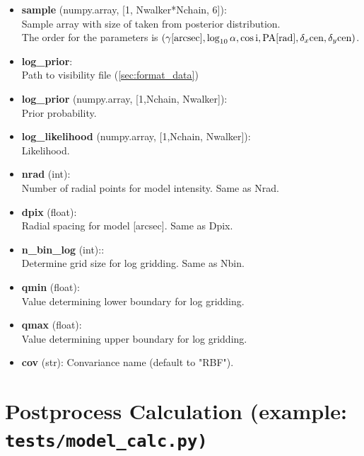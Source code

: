 \documentclass{report}
\begin{document}
\begin{itemize}
    \item \textbf{sample} (numpy.array, [1, Nwalker*Nchain, 6]): \\ Sample array with size of  taken from posterior distribution. \\ 
    The order for the parameters is 
$(\gamma [{\rm arcsec}], \log_{10} \alpha, \cos {\rm i}, {\rm PA [rad]}, \delta_x{\rm cen}, \delta_y{\rm cen})$.    \item \textbf{log\_prior}: \\ Path to visibility file (\ref{sec:format_data})
    \item \textbf{log\_prior} (numpy.array, [1,Nchain,  Nwalker]): \\ Prior probability. 
    \item \textbf{log\_likelihood} (numpy.array, [1,Nchain,  Nwalker]): \\ Likelihood. 
    \item \textbf{nrad} (int):\\  Number of radial points for model intensity. Same as Nrad.  
    \item \textbf{dpix} (float):\\ Radial spacing for model [arcsec]. Same as Dpix.  
    \item \textbf{n\_bin\_log} (int)::  \\ Determine grid size for log gridding. Same as Nbin. 
    \item \textbf{qmin} (float): \\ Value determining lower boundary for log gridding. 
    \item \textbf{qmax} (float):\\  Value determining upper boundary for log gridding. 
    \item \textbf{cov} (str): Convariance name (default to "RBF"). 
\end{itemize}
    


\section{ Postprocess Calculation  (example: \texttt{tests/model\_calc.py)}}
\end{document}
